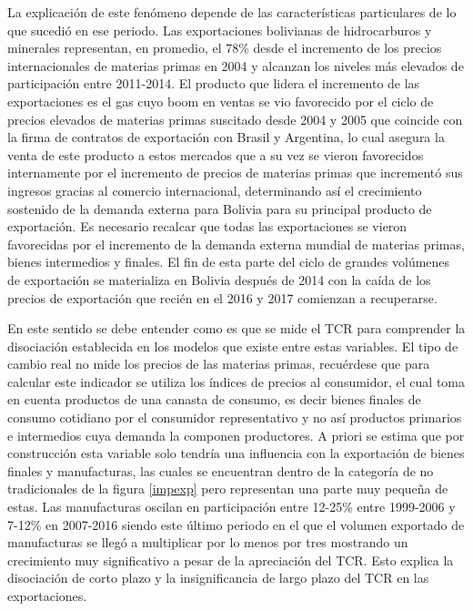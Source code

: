 \documentclass[12pt,letterpaper]{article}
\begin{document}
La explicación de este fenómeno depende de las características particulares de lo que sucedió en ese periodo. Las exportaciones bolivianas de hidrocarburos y minerales representan, en promedio, el 78\% desde el incremento de los precios internacionales de materias primas en 2004 y alcanzan los niveles más elevados de participación entre 2011-2014. El producto que lidera el incremento de las exportaciones es el gas cuyo boom en ventas se vio favorecido por el ciclo de precios elevados de materias primas suscitado desde 2004 y 2005 que coincide con la firma de contratos de exportación con Brasil y Argentina, lo cual asegura la venta de este producto a estos mercados que a su vez se vieron favorecidos internamente por el incremento de precios de materias primas que incrementó sus ingresos gracias al comercio internacional, determinando así el crecimiento sostenido de la demanda externa para Bolivia para su principal producto de exportación. Es necesario recalcar que todas las exportaciones se vieron favorecidas por el incremento de la demanda externa mundial de materias primas, bienes intermedios y finales. El fin de esta parte del ciclo de grandes volúmenes de exportación se materializa en Bolivia después de 2014 con la caída de los precios de exportación que recién en el 2016 y 2017 comienzan a recuperarse.

En este sentido se debe entender como es que se mide el TCR para comprender la disociación establecida en los modelos que existe entre estas variables. El tipo de cambio real no mide los precios de las materias primas, recuérdese que para calcular este indicador se utiliza los índices de precios al consumidor, el cual toma en cuenta productos de una canasta de consumo, es decir bienes finales de consumo cotidiano por el consumidor representativo y no así productos primarios e intermedios cuya demanda la componen productores. A priori se estima que por construcción esta variable solo tendría una influencia con la exportación de bienes finales y manufacturas, las cuales se encuentran dentro de la categoría de no tradicionales de la figura \ref{impexp} pero representan una parte muy pequeña de estas. Las manufacturas oscilan en participación entre 12-25\% entre 1999-2006 y 7-12\% en 2007-2016 siendo este último periodo en el que el volumen exportado de manufacturas se llegó a multiplicar por lo menos por tres mostrando un crecimiento muy significativo a pesar de la apreciación del TCR. Esto explica la disociación de corto plazo y la insignificancia de largo plazo del TCR en las exportaciones.
\end{document}

